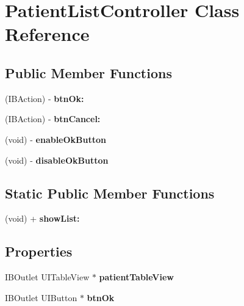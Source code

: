 \hypertarget{interface_patient_list_controller}{
\section{PatientListController Class Reference}
\label{interface_patient_list_controller}
}
\subsection*{Public Member Functions}
\begin{DoxyCompactItemize}
\item 
\hypertarget{interface_patient_list_controller_a8977e2a5532d9782f0bd4810f7a57551}{
(IBAction) -\/ {\bfseries btnOk:}}
\label{interface_patient_list_controller_a8977e2a5532d9782f0bd4810f7a57551}

\item 
\hypertarget{interface_patient_list_controller_a6a2da426ccd3fb9efc68d4ebf335f46b}{
(IBAction) -\/ {\bfseries btnCancel:}}
\label{interface_patient_list_controller_a6a2da426ccd3fb9efc68d4ebf335f46b}

\item 
\hypertarget{interface_patient_list_controller_a88deee2815e1f9768acffc4d26e28658}{
(void) -\/ {\bfseries enableOkButton}}
\label{interface_patient_list_controller_a88deee2815e1f9768acffc4d26e28658}

\item 
\hypertarget{interface_patient_list_controller_acd28739c4240c43fce97f66059c3116a}{
(void) -\/ {\bfseries disableOkButton}}
\label{interface_patient_list_controller_acd28739c4240c43fce97f66059c3116a}

\end{DoxyCompactItemize}
\subsection*{Static Public Member Functions}
\begin{DoxyCompactItemize}
\item 
\hypertarget{interface_patient_list_controller_a3f6281869644f60a76e4cfe532cd2a29}{
(void) + {\bfseries showList:}}
\label{interface_patient_list_controller_a3f6281869644f60a76e4cfe532cd2a29}

\end{DoxyCompactItemize}
\subsection*{Properties}
\begin{DoxyCompactItemize}
\item 
\hypertarget{interface_patient_list_controller_a057f2281b88f631b1486fd807477ffd1}{
IBOutlet UITableView $\ast$ {\bfseries patientTableView}}
\label{interface_patient_list_controller_a057f2281b88f631b1486fd807477ffd1}

\item 
\hypertarget{interface_patient_list_controller_a747297d82ec24b59dce0d6598b8d9458}{
IBOutlet UIButton $\ast$ {\bfseries btnOk}}
\label{interface_patient_list_controller_a747297d82ec24b59dce0d6598b8d9458}

\end{DoxyCompactItemize}


